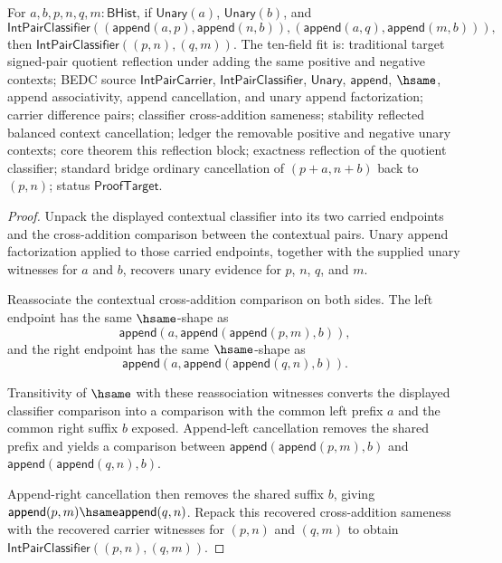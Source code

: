 \begin{theorem}
\label{thm:int-pair-classifier-balanced-append-context-reflection}
For $a,b,p,n,q,m:\mathsf{BHist}$, if $\mathsf{Unary}(a)$,
$\mathsf{Unary}(b)$, and
$$
\mathsf{IntPairClassifier}
((\mathsf{append}(a,p),\mathsf{append}(n,b)),
(\mathsf{append}(a,q),\mathsf{append}(m,b))),
$$
then $\mathsf{IntPairClassifier}((p,n),(q,m))$.
The ten-field fit is: traditional target signed-pair quotient reflection under
adding the same positive and negative contexts; BEDC source
$\mathsf{IntPairCarrier}$, $\mathsf{IntPairClassifier}$, $\mathsf{Unary}$,
$\mathsf{append}$, $\hsame$, append associativity, append cancellation, and
unary append factorization; carrier difference pairs; classifier cross-addition
sameness; stability reflected balanced context cancellation; ledger the
removable positive and negative unary contexts; core theorem this reflection
block; exactness reflection of the quotient classifier; standard bridge
ordinary cancellation of $(p+a,n+b)$ back to $(p,n)$; status
$\mathsf{ProofTarget}$.
\end{theorem}
\begin{proof}
Unpack the displayed contextual classifier into its two carried endpoints and
the cross-addition comparison between the contextual pairs. Unary append
factorization applied to those carried endpoints, together with the supplied
unary witnesses for $a$ and $b$, recovers unary evidence for $p$, $n$, $q$,
and $m$.

Reassociate the contextual cross-addition comparison on both sides. The left
endpoint has the same $\hsame$-shape as
$$
\mathsf{append}(a,\mathsf{append}(\mathsf{append}(p,m),b)),
$$
and the right endpoint has the same $\hsame$-shape as
$$
\mathsf{append}(a,\mathsf{append}(\mathsf{append}(q,n),b)).
$$

Transitivity of $\hsame$ with these reassociation witnesses converts the
displayed classifier comparison into a comparison with the common left prefix
$a$ and the common right suffix $b$ exposed. Append-left cancellation removes
the shared prefix and yields a comparison between
$\mathsf{append}(\mathsf{append}(p,m),b)$ and
$\mathsf{append}(\mathsf{append}(q,n),b)$.

Append-right cancellation then removes the shared suffix $b$, giving
$\mathsf{append}(p,m)\hsame\mathsf{append}(q,n)$. Repack this recovered
cross-addition sameness with the recovered carrier witnesses for $(p,n)$ and
$(q,m)$ to obtain $\mathsf{IntPairClassifier}((p,n),(q,m))$.
\end{proof}

